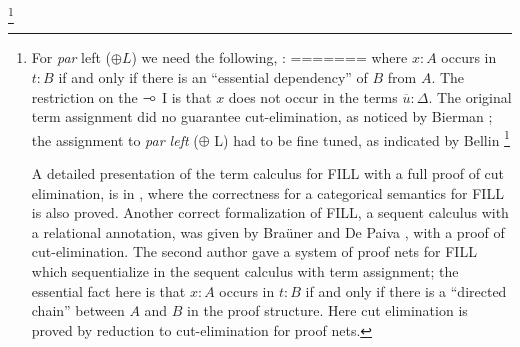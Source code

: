 \footnote{For \emph{par} left ($\oplus L$) we need the following, :
=======
where $x: A$ occurs in $t:B$ if and only if there is an ``essential
dependency'' of $B$ from $A$.  The restriction on the $\mathrel{-\!\circ}$ I is
that $x$ does not occur in the terms $\overline{u}:\Delta$.  The
original term assignment did no guarantee cut-elimination, as noticed
by Bierman \cite{Bierman:1996}; the assignment to \emph{par left}
($\oplus$ L) had to be fine tuned, as indicated by Bellin
\cite{Bellin:1997}
\footnote{For \emph{par} left ($\oplus L$) we need the following:
>>>>>>> 9fbc5b8c7473d9b3d8c55af93a8f19afad83c78d
\[
\AxiomC{$x:A, \overline{x}:\Gamma\vdash \overline{r}: \Delta\qquad y:B, \overline{y}:\Pi\vdash \overline{s}: \Lambda$}
\UnaryInfC{$z: A \oplus B, \overline{x}:\Gamma, \overline{y}:\Pi\vdash  \overline{r'}: \Delta, 
\overline{s'}: \Lambda $}
\DisplayProof
\]
where for $r'_i\in \overline{r'}$ and $s'_j \in \overline{s'}$ we have 
\[
\begin{tabular}{rll}
$r'_i =$ & $\mathtt{let}\ z\ \mathtt{be}\ x-\ \mathtt{in}\ r_i, \qquad$ & if $x$ occurs in $r_i$, \\
             & $r_i$                                                                              & otherwise.\\
$s'_j =$ & $\mathtt{let}\ z\ \mathtt{be}\ -y\ \mathtt{in}\ s_j, \qquad$ & if $y$ occurs in $s_j$, \\
             & $s_j$                                                                              & otherwise.\\
\end{tabular}
\]
We may introduce non-existent dependencies if we define always $r'_i =
\mathtt{let}\ z\ \mathtt{be}\ x-\ \mathtt{in}\ r_i.$
}

A detailed presentation of the term calculus for FILL with a full proof of cut elimination, is in \cite{EadesDePaiva2016}, 
where the correctness for a categorical semantics for FILL is also proved.
Another correct formalization of FILL, a sequent calculus with a relational annotation, was given by Bra\"uner and De Paiva \cite{BraunedDePaiva:1997}, with a proof of cut-elimination.
The second author \cite{Bellin:1997} gave a system of proof nets for FILL which sequentialize in the sequent calculus
with term assignment; the essential fact here is that $x:A$ occurs in $t:B$ if and only if there is a ``directed chain''
between $A$ and $B$ in the proof structure. Here cut elimination is proved by reduction to cut-elimination for proof nets.  

}
